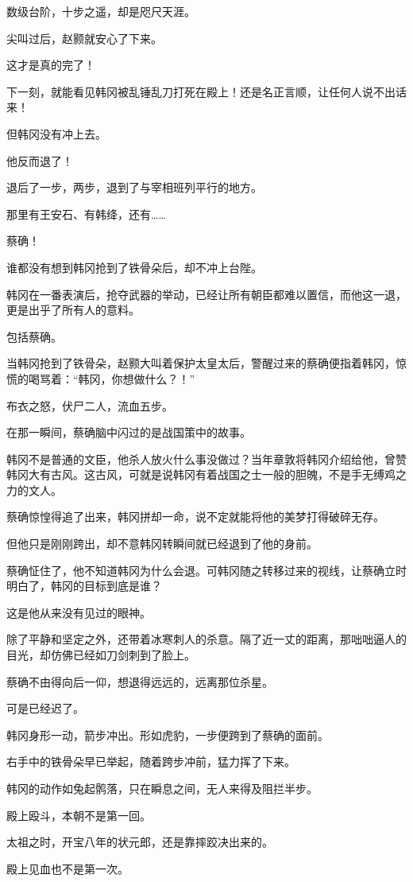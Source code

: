 数级台阶，十步之遥，却是咫尺天涯。

尖叫过后，赵颢就安心了下来。

这才是真的完了！

下一刻，就能看见韩冈被乱锤乱刀打死在殿上！还是名正言顺，让任何人说不出话来！

但韩冈没有冲上去。

他反而退了！

退后了一步，两步，退到了与宰相班列平行的地方。

那里有王安石、有韩绛，还有……

蔡确！

谁都没有想到韩冈抢到了铁骨朵后，却不冲上台陛。

韩冈在一番表演后，抢夺武器的举动，已经让所有朝臣都难以置信，而他这一退，更是出乎了所有人的意料。

包括蔡确。

当韩冈抢到了铁骨朵，赵颢大叫着保护太皇太后，警醒过来的蔡确便指着韩冈，惊慌的喝骂着：“韩冈，你想做什么？！”

布衣之怒，伏尸二人，流血五步。

在那一瞬间，蔡确脑中闪过的是战国策中的故事。

韩冈不是普通的文臣，他杀人放火什么事没做过？当年章敦将韩冈介绍给他，曾赞韩冈大有古风。这古风，可就是说韩冈有着战国之士一般的胆魄，不是手无缚鸡之力的文人。

蔡确惊惶得追了出来，韩冈拼却一命，说不定就能将他的美梦打得破碎无存。

但他只是刚刚跨出，却不意韩冈转瞬间就已经退到了他的身前。

蔡确怔住了，他不知道韩冈为什么会退。可韩冈随之转移过来的视线，让蔡确立时明白了，韩冈的目标到底是谁？

这是他从来没有见过的眼神。

除了平静和坚定之外，还带着冰寒刺人的杀意。隔了近一丈的距离，那咄咄逼人的目光，却仿佛已经如刀剑刺到了脸上。

蔡确不由得向后一仰，想退得远远的，远离那位杀星。

可是已经迟了。

韩冈身形一动，箭步冲出。形如虎豹，一步便跨到了蔡确的面前。

右手中的铁骨朵早已举起，随着跨步冲前，猛力挥了下来。

韩冈的动作如兔起鹘落，只在瞬息之间，无人来得及阻拦半步。

殿上殴斗，本朝不是第一回。

太祖之时，开宝八年的状元郎，还是靠摔跤决出来的。

殿上见血也不是第一次。

